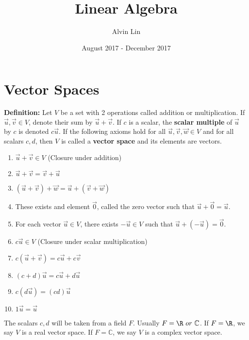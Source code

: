 \documentclass{math}
\title{Linear Algebra}
\author{Alvin Lin}
\date{August 2017 - December 2017}
\begin{document}
\maketitle

\section*{Vector Spaces}
\textbf{Definition:} Let \( V \) be a set with 2 operations called addition or
multiplication. If \( \vec{u},\vec{v}\in V \), denote their sum by \( \vec{u}+
\vec{v} \). If \( c \) is a scalar, the \textbf{scalar multiple} of
\( \vec{u} \) by \( c \) is denoted \( c\vec{u} \). If the following axioms
hold for all \( \vec{u},\vec{v},\vec{w}\in V \) and for all scalars \( c,d \),
then \( V \) is called a \textbf{vector space} and its elements are vectors.
\begin{enumerate}
  \item \( \vec{u}+\vec{v}\in V \) (Closure under addition)
  \item \( \vec{u}+\vec{v} = \vec{v}+\vec{u} \)
  \item \( (\vec{u}+\vec{v})+\vec{w} = \vec{u}+(\vec{v}+\vec{w}) \)
  \item These exists and element \( \vec{0} \), called the zero vector such that
  \( \vec{u}+\vec{0} = \vec{u} \).
  \item For each vector \( \vec{u}\in V \), there exists \( -\vec{u}\in V \)
  such that \( \vec{u}+(-\vec{u}) = \vec{0} \).
  \item \( c\vec{u}\in V \) (Closure under scalar multiplication)
  \item \( c(\vec{u}+\vec{v}) = c\vec{u}+c\vec{v} \)
  \item \( (c+d)\vec{u} = c\vec{u}+d\vec{u} \)
  \item \( c(d\vec{u}) = (cd)\vec{u} \)
  \item \( 1\vec{u} = \vec{u} \)
\end{enumerate}
The scalars \( c,d \) will be taken from a field \( F \). Usually \( F = \R~or~
\mathbb{C} \). If \( F = \R \), we say \( V \) is a real vector space. If
\( F = \mathbb{C} \), we say \( V \) is a complex vector space.
\end{document}
